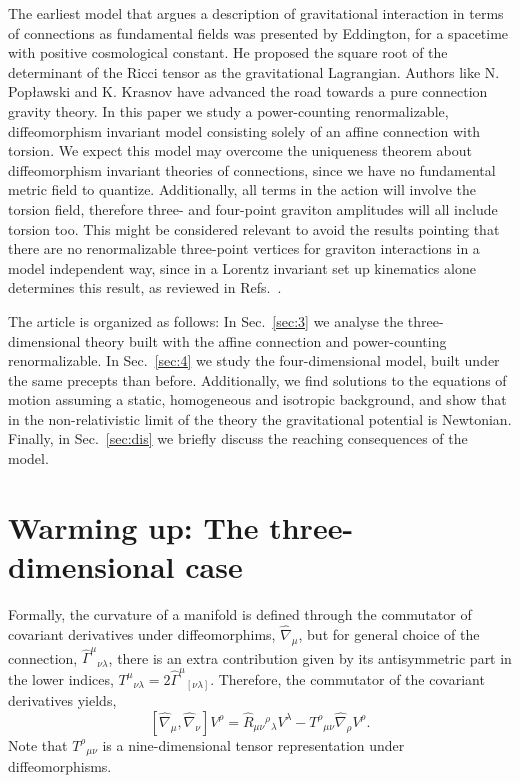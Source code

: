\documentclass{ws-mpla}
\newcommand{\Ga}{\Gamma}
\newcommand\hnab[1]{\hat{\nabla}_{#1}}
\newcommand{\comm}[2]{\left[#1,#2\right]}
\renewcommand{\(}{\left(}
\renewcommand{\)}{\right)}
\renewcommand{\[}{\left[}
\renewcommand{\]}{\right]}
\begin{document}
The earliest model that argues  a description of gravitational interaction in terms of connections as fundamental fields  was presented by Eddington,\cite{Eddington1923math} for a spacetime with positive cosmological constant. He proposed the square root of the determinant of the Ricci tensor as the gravitational Lagrangian. Authors like N. Pop{\l}awski\cite{Poplawski:2012bw} and K. Krasnov\cite{Krasnov:2011pp} have advanced the road towards a pure connection gravity theory. In this paper we study a power-counting renormalizable,  diffeomorphism invariant model  consisting  solely of an affine connection with torsion. We expect  this model may  overcome  the uniqueness theorem about diffeomorphism invariant theories of connections, since we  have no fundamental metric field to quantize.  Additionally, all terms in the action will involve the torsion field, therefore three- and four-point graviton amplitudes will all include torsion too. This might be considered relevant to avoid the results pointing that there are no renormalizable three-point vertices for graviton interactions in a model independent way, since in a Lorentz invariant set up kinematics alone determines this result, as reviewed in Refs.~.
 
The article is organized as follows: In Sec.~\ref{sec:3} we analyse the three-dimensional theory built with the affine connection and power-counting renormalizable. In Sec.~\ref{sec:4} we study the four-dimensional model, built under the same precepts than before. Additionally, we find solutions to the equations of motion assuming a static, homogeneous and isotropic background, and show that in the non-relativistic limit of the theory the gravitational potential is Newtonian. Finally, in Sec.~\ref{sec:dis} we briefly discuss the reaching consequences of the model.



\section{\label{sec:3} Warming up: The three-dimensional case}


Formally, the curvature of a manifold is defined through the commutator of covariant derivatives under diffeomorphims, $\hat{\nabla}_\mu$, but for general choice of the connection, $\hat{\Ga}^\mu{}_{\nu\lambda}$, there is an extra contribution given by its antisymmetric part in the lower indices, $T^\mu{}_{\nu\lambda} = 2\hat{\Ga}^\mu{}_{[\nu\lambda]}$. Therefore, the commutator of the covariant derivatives yields,
\begin{equation}
  \comm{\hat{\nabla}_{\mu}}{\hat{\nabla}_{\nu}}V^\rho = \hat{R}_{\mu\nu}{}^\rho{}_\lambda V^\lambda - T^\rho{}_{\mu\nu}\hnab{\rho}V^\rho.
  \label{curvdef}
\end{equation}
Note that $T^\rho{}_{\mu\nu}$ is a nine-dimensional tensor representation under diffeomorphisms.
\end{document}
